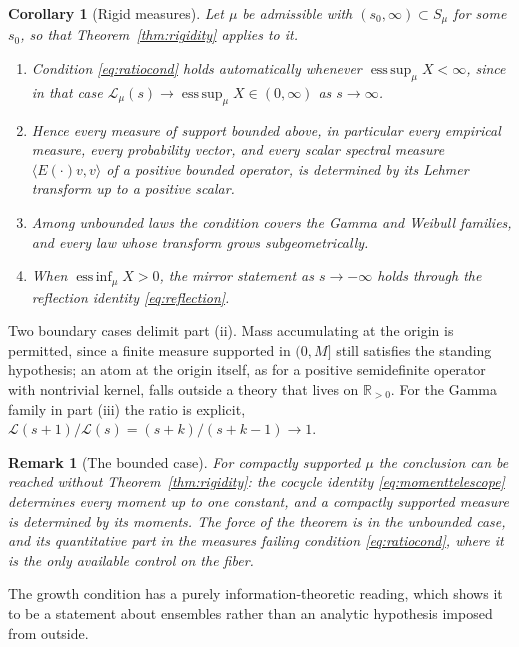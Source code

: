 \documentclass[sn-mathphys-num]{sn-jnl}
\theoremstyle{thmstyleone}%
\newtheorem{corollary}{Corollary}%
\theoremstyle{thmstyletwo}%
\newtheorem{remark}{Remark}%
\theoremstyle{thmstylethree}%
\theoremstyle{thmstyleone}%
\providecommand{\Rpos}{\mathbb{R}_{>0}}
\providecommand{\Leh}{\mathscr{L}}
\providecommand{\esssup}{\operatorname{ess\,sup}}
\providecommand{\essinf}{\operatorname{ess\,inf}}
\begin{document}
	\begin{corollary}[Rigid measures]\label{cor:rigid}
		Let $\mu$ be admissible with $(s_0,\infty)\subset S_\mu$ for some
		$s_0$, so that Theorem~\ref{thm:rigidity} applies to it.
		\begin{enumerate}[label=\textup{(\roman*)},leftmargin=2.2em]
			\item Condition \eqref{eq:ratiocond} holds automatically
			whenever $\esssup_\mu X<\infty$, since in that case
			$\Leh_\mu(s)\to\esssup_\mu X\in(0,\infty)$ as
			$s\to\infty$.
			\item Hence every measure of support bounded above, in
			particular every empirical measure, every probability vector,
			and every scalar spectral measure
			$\langle E(\cdot)v,v\rangle$ of a positive bounded
			operator, is determined by its Lehmer transform up to a
			positive scalar.
			\item Among unbounded laws the condition covers the Gamma and
			Weibull families, and every law whose transform grows
			subgeometrically.
			\item When ${\essinf_\mu X>0}$, the mirror statement as
			$s\to-\infty$ holds through the reflection identity
			\eqref{eq:reflection}.
		\end{enumerate}
	\end{corollary}
	
	Two boundary cases delimit part (ii). Mass accumulating at the
	origin is permitted, since a finite measure supported in $(0,M]$
	still satisfies the standing hypothesis; an atom at the origin
	itself, as for a positive semidefinite operator with nontrivial
	kernel, falls outside a theory that lives on $\Rpos$. For the
	Gamma family in part (iii) the ratio is explicit,
	$\Leh(s+1)/\Leh(s)=(s+k)/(s+k-1)\to1$.
	
	\begin{remark}[The bounded case]\label{rem:hausdorff}
		For compactly supported $\mu$ the conclusion can be reached
		without Theorem~\ref{thm:rigidity}: the cocycle identity
		\eqref{eq:momenttelescope} determines every moment up to one
		constant, and a compactly supported measure is determined by its
		moments. The force of the theorem is in the unbounded case, and
		its quantitative part in the measures failing condition
		\eqref{eq:ratiocond}, where it is the only available control on
		the fiber.
	\end{remark}
	
	The growth condition has a purely information-theoretic reading,
	which shows it to be a statement about ensembles rather than an
	analytic hypothesis imposed from outside.
	
\end{document}
